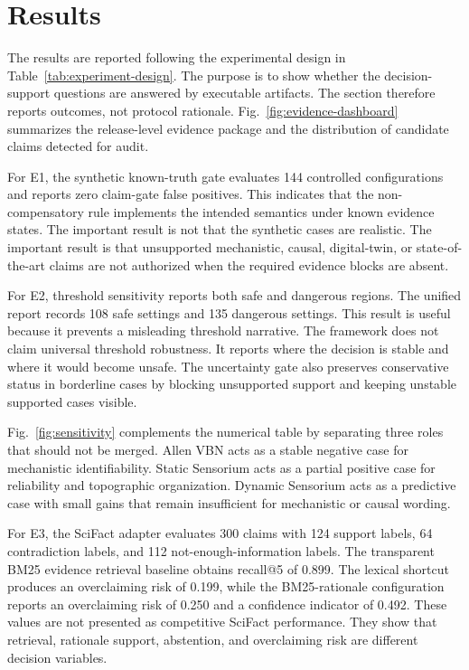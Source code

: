 \section{Results}
\label{sec:results}

The results are reported following the experimental design in Table~\ref{tab:experiment-design}. The purpose is to show whether the decision-support questions are answered by executable artifacts. The section therefore reports outcomes, not protocol rationale. Fig.~\ref{fig:evidence-dashboard} summarizes the release-level evidence package and the distribution of candidate claims detected for audit.



For E1, the synthetic known-truth gate evaluates 144 controlled configurations and reports zero claim-gate false positives. This indicates that the non-compensatory rule implements the intended semantics under known evidence states. The important result is not that the synthetic cases are realistic. The important result is that unsupported mechanistic, causal, digital-twin, or state-of-the-art claims are not authorized when the required evidence blocks are absent.

For E2, threshold sensitivity reports both safe and dangerous regions. The unified report records 108 safe settings and 135 dangerous settings. This result is useful because it prevents a misleading threshold narrative. The framework does not claim universal threshold robustness. It reports where the decision is stable and where it would become unsafe. The uncertainty gate also preserves conservative status in borderline cases by blocking unsupported support and keeping unstable supported cases visible.



Fig.~\ref{fig:sensitivity} complements the numerical table by separating three roles that should not be merged. Allen VBN acts as a stable negative case for mechanistic identifiability. Static Sensorium acts as a partial positive case for reliability and topographic organization. Dynamic Sensorium acts as a predictive case with small gains that remain insufficient for mechanistic or causal wording.



For E3, the SciFact adapter evaluates 300 claims with 124 support labels, 64 contradiction labels, and 112 not-enough-information labels. The transparent BM25 evidence retrieval baseline obtains recall@5 of 0.899. The lexical shortcut produces an overclaiming risk of 0.199, while the BM25-rationale configuration reports an overclaiming risk of 0.250 and a confidence indicator of 0.492. These values are not presented as competitive SciFact performance. They show that retrieval, rationale support, abstention, and overclaiming risk are different decision variables.

